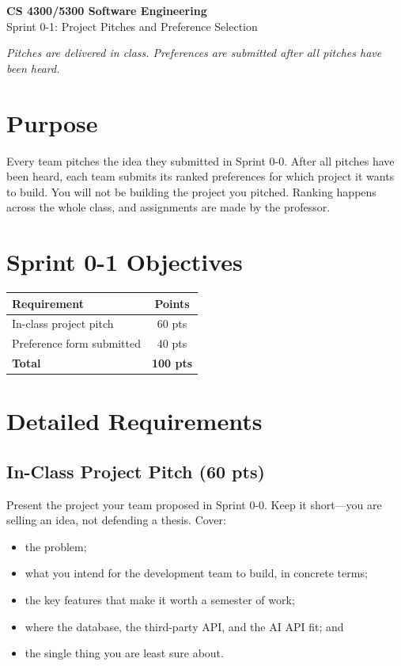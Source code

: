 \documentclass[11pt]{article}
\begin{document}
\begin{center}
{\LARGE\textbf{CS 4300/5300 Software Engineering}}\\[0.5em]
{\Large Sprint 0-1: Project Pitches and Preference Selection}\\[1em]
\end{center}

\noindent\textit{Pitches are delivered in class. Preferences are submitted after all pitches have been heard.}

\section{Purpose}

Every team pitches the idea they submitted in Sprint 0-0. After all pitches have been heard, each team submits its ranked preferences for which project it wants to build. You will not be building the project you pitched. Ranking happens across the whole class, and assignments are made by the professor. 

\section{Sprint 0-1 Objectives}

\begin{center}
\begin{tabular}{lc}
\toprule
\textbf{Requirement} & \textbf{Points} \\
\midrule
In-class project pitch & 60 pts \\
Preference form submitted & 40 pts \\
\midrule
\textbf{Total} & \textbf{100 pts} \\
\bottomrule
\end{tabular}
\end{center}

\section{Detailed Requirements}

\subsection{In-Class Project Pitch (60 pts)}

Present the project your team proposed in Sprint 0-0. Keep it short---you are selling an idea, not defending a thesis. Cover:

\begin{itemize}
    \item the problem;
    \item what you intend for the development team to build, in concrete terms;
    \item the key features that make it worth a semester of work;
    \item where the database, the third-party API, and the AI API fit; and
    \item the single thing you are least sure about.
\end{itemize}
\end{document}
